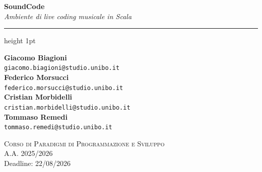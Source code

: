 \documentclass[a4paper,12pt]{article}
\begin{document}
    \thispagestyle{empty}

    \begin{center}
        \vspace*{2.5cm} %

        {\Huge \textbf{SoundCode}} \\[0.4cm]
        {\Large \textit{Ambiente di live coding musicale in Scala}} \\[0.8cm]

        \hrule height 1pt
        \vspace{2cm}

        {\large \textbf{Giacomo Biagioni}} \\
        {\small \texttt{giacomo.biagioni@studio.unibo.it}} \\[0.6cm]

        {\large \textbf{Federico Morsucci}} \\
        {\small \texttt{federico.morsucci@studio.unibo.it}} \\[0.6cm]

        {\large \textbf{Cristian Morbidelli}} \\
        {\small \texttt{cristian.morbidelli@studio.unibo.it}} \\[0.6cm]

        {\large \textbf{Tommaso Remedi}} \\
        {\small \texttt{tommaso.remedi@studio.unibo.it}} \\

        \vfill

        {\large \textsc{Corso di Paradigmi di Programmazione e Sviluppo}} \\[0.2cm]
        {\normalsize A.A. 2025/2026} \\[0.2cm]
        {\small Deadline: 22/08/2026}

        \vspace*{1cm} %
    \end{center}

    \newpage
    \tableofcontents
    \newpage

    


    


\end{document}
